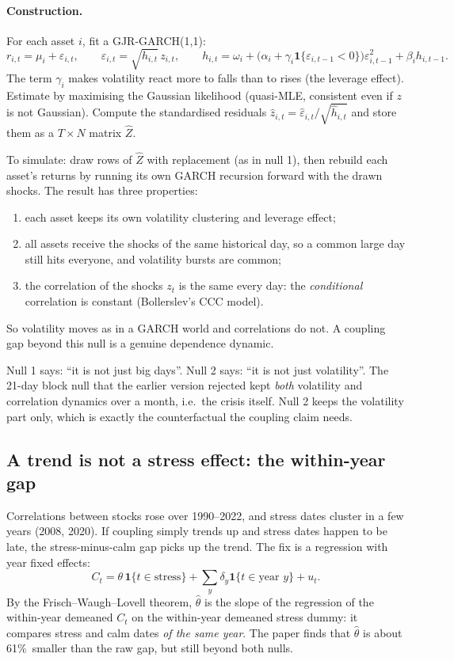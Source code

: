 \documentclass[11pt]{article}
\theoremstyle{plain}
\theoremstyle{definition}
\theoremstyle{remark}
\newcommand{\FESHRINK}{61\%}
\begin{document}
\paragraph{Construction.} For each asset $i$, fit a GJR-GARCH(1,1):
\[
r_{i,t}=\mu_i+\varepsilon_{i,t},\qquad \varepsilon_{i,t}=\sqrt{h_{i,t}}\,z_{i,t},\qquad
h_{i,t}=\omega_i+\bigl(\alpha_i+\gamma_i\mathbf 1\{\varepsilon_{i,t-1}<0\}\bigr)\varepsilon_{i,t-1}^2+\beta_ih_{i,t-1}.
\]
The term $\gamma_i$ makes volatility react more to falls than to rises (the
leverage effect). Estimate by maximising the Gaussian likelihood (quasi-MLE,
consistent even if $z$ is not Gaussian). Compute the standardised residuals
$\hat z_{i,t}=\hat\varepsilon_{i,t}/\sqrt{\hat h_{i,t}}$ and store them as a
$T\times N$ matrix $\hat Z$.

To simulate: draw rows of $\hat Z$ with replacement (as in null 1), then
rebuild each asset's returns by running its own GARCH recursion forward with
the drawn shocks. The result has three properties:
\begin{enumerate}
\item each asset keeps its own volatility clustering and leverage effect;
\item all assets receive the shocks of the same historical day, so a common
large day still hits everyone, and volatility bursts are common;
\item the correlation of the shocks $z_t$ is the same every day: the
\emph{conditional} correlation is constant (Bollerslev's CCC model).
\end{enumerate}
So volatility moves as in a GARCH world and correlations do not. A coupling
gap beyond this null is a genuine dependence dynamic.

\begin{intuition}
Null 1 says: ``it is not just big days''. Null 2 says: ``it is not just
volatility''. The 21-day block null that the earlier version rejected kept
\emph{both} volatility and correlation dynamics over a month, i.e.\ the crisis
itself. Null 2 keeps the volatility part only, which is exactly the
counterfactual the coupling claim needs.
\end{intuition}

\subsection{A trend is not a stress effect: the within-year gap}

Correlations between stocks rose over 1990--2022, and stress dates cluster in
a few years (2008, 2020). If coupling simply trends up and stress dates happen
to be late, the stress-minus-calm gap picks up the trend. The fix is a
regression with year fixed effects:
\[
C_t=\theta\,\mathbf 1\{t\in\text{stress}\}+\sum_y\delta_y\mathbf 1\{t\in\text{year }y\}+u_t .
\]
By the Frisch--Waugh--Lovell theorem, $\hat\theta$ is the slope of the
regression of the within-year demeaned $C_t$ on the within-year demeaned
stress dummy: it compares stress and calm dates \emph{of the same year}. The
paper finds that $\hat\theta$ is about \FESHRINK\ smaller than the raw gap, but
still beyond both nulls.
\end{document}
